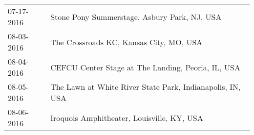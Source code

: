 \begin{supertabular}{ll}
 07-17-2016 &               Stone Pony Summerstage, Asbury Park, NJ, USA \\
 08-03-2016 &                    The Crossroads KC, Kansas City, MO, USA \\
 08-04-2016 &         CEFCU Center Stage at The Landing, Peoria, IL, USA \\
 08-05-2016 &  The Lawn at White River State Park, Indianapolis, IN, USA \\
 08-06-2016 &                 Iroquois Amphitheater, Louisville, KY, USA \\
\end{supertabular}
